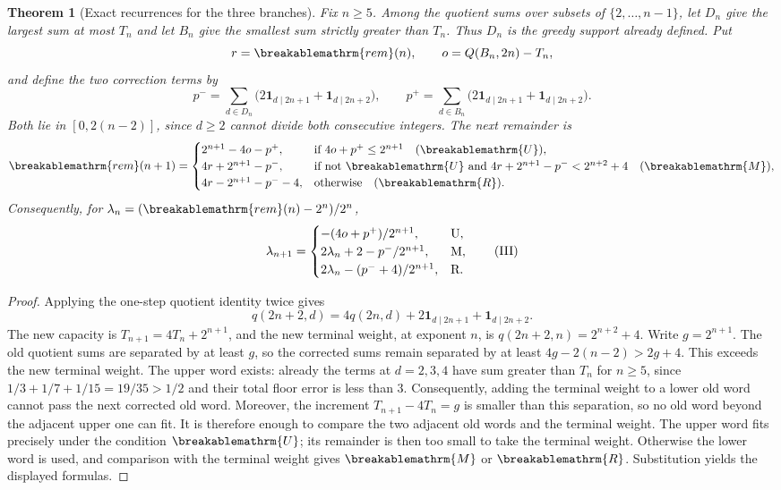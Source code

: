 \documentclass[11pt]{article}
\theoremstyle{plain}
\newtheorem{thm}{Theorem}[section]
\theoremstyle{definition}
\theoremstyle{remark}
\renewcommand{\mathrm}[1]{\ifmmode\breakablemathrm{#1}\else\textrm{#1}\fi}%
\begin{document}
\begin{thm}[Exact recurrences for the three branches]
\label{thm:dynamics}
Fix $n\ge5$.  Among the quotient sums over subsets of
$\{2,\ldots,n-1\}$, let $D_n$ give the largest sum at most $T_n$
and let $B_n$ give the smallest sum strictly greater than $T_n$.
Thus $D_n$ is the greedy support already defined.  Put
\[
 r=\mathrm{rem}(n),\qquad o=Q(B_n,2n)-T_n,
\]
and define the two correction terms by
\[
 p^- =\sum_{d\in D_n}\bigl(2\mathbf1_{d\mid2n+1}
                              +\mathbf1_{d\mid2n+2}\bigr),\qquad
 p^+ =\sum_{d\in B_n}\bigl(2\mathbf1_{d\mid2n+1}
                              +\mathbf1_{d\mid2n+2}\bigr).
\]
Both lie in $[0,2(n-2)]$, since $d\ge2$ cannot divide both
consecutive integers.  The next remainder is
\[
 \mathrm{rem}(n+1)=
 \begin{cases}
 2^{n+1}-4o-p^+,&\text{if }4o+p^+\le2^{n+1}\quad(\mathrm U),\\
 4r+2^{n+1}-p^-,&\text{if not }\mathrm U\text{ and }
                   4r+2^{n+1}-p^-<2^{n+2}+4\quad(\mathrm M),\\
 4r-2^{n+1}-p^--4,&\text{otherwise}\quad(\mathrm R).
 \end{cases}
\]
Consequently, for $\lambda_n=(\mathrm{rem}(n)-2^n)/2^n$,
\begin{equation*}
 \lambda_{n+1}=
 \begin{cases}
 -(4o+p^+)/2^{n+1},&\mathrm U,\\
 2\lambda_n+2-p^-/2^{n+1},&\mathrm M,\\
 2\lambda_n-(p^-+4)/2^{n+1},&\mathrm R.
 \end{cases}
 \tag{III}
\end{equation*}
\end{thm}

\begin{proof}
Applying the one-step quotient identity twice gives
\[
 q(2n+2,d)=4q(2n,d)+2\mathbf1_{d\mid2n+1}
                         +\mathbf1_{d\mid2n+2}.
\]
The new capacity is $T_{n+1}=4T_n+2^{n+1}$, and the new terminal
weight, at exponent $n$, is $q(2n+2,n)=2^{n+2}+4$.
Write $g=2^{n+1}$.  The old quotient sums are separated by at
least $g$, so the corrected sums remain separated by at least
$4g-2(n-2)>2g+4$.  This exceeds the new terminal weight.
The upper word exists: already the terms at $d=2,3,4$ have
sum greater than $T_n$ for $n\ge5$, since
$1/3+1/7+1/15=19/35>1/2$ and their total floor error is less than $3$.
Consequently, adding the terminal weight to a lower old word cannot
pass the next corrected old word.  Moreover, the increment
$T_{n+1}-4T_n=g$ is smaller than this separation, so no old word
beyond the adjacent upper one can fit.  It is therefore enough
to compare the two adjacent old words and the terminal weight.  The upper word fits precisely under
the condition $\mathrm U$; its remainder is then too small to take
the terminal weight.  Otherwise the lower word is used, and
comparison with the terminal weight gives $\mathrm M$ or
$\mathrm R$.  Substitution yields the displayed formulas.
\end{proof}
\end{document}
